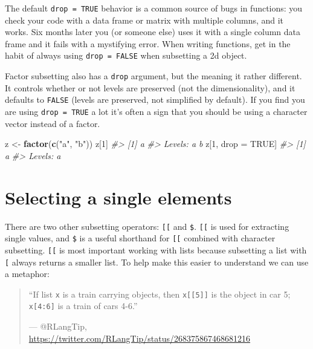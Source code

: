 \documentclass[]{book}
\newenvironment{Shaded}{\begin{snugshade}}{\end{snugshade}}
\newcommand{\KeywordTok}[1]{\textcolor[rgb]{0.13,0.29,0.53}{\textbf{#1}}}
\newcommand{\DecValTok}[1]{\textcolor[rgb]{0.00,0.00,0.81}{#1}}
\newcommand{\StringTok}[1]{\textcolor[rgb]{0.31,0.60,0.02}{#1}}
\newcommand{\CommentTok}[1]{\textcolor[rgb]{0.56,0.35,0.01}{\textit{#1}}}
\newcommand{\OtherTok}[1]{\textcolor[rgb]{0.56,0.35,0.01}{#1}}
\newcommand{\NormalTok}[1]{#1}
\theoremstyle{definition}
\theoremstyle{definition}
\theoremstyle{definition}
\theoremstyle{remark}
\begin{document}
The default \texttt{drop\ =\ TRUE} behavior is a common source of bugs
in functions: you check your code with a data frame or matrix with
multiple columns, and it works. Six months later you (or someone else)
uses it with a single column data frame and it fails with a mystifying
error. When writing functions, get in the habit of always using
\texttt{drop\ =\ FALSE} when subsetting a 2d object.

Factor subsetting also has a \texttt{drop} argument, but the meaning it
rather different. It controls whether or not levels are preserved (not
the dimensionality), and it defaults to \texttt{FALSE} (levels are
preserved, not simplified by default). If you find you are using
\texttt{drop\ =\ TRUE} a lot it's often a sign that you should be using
a character vector instead of a factor.

\begin{Shaded}
\begin{Highlighting}[]
\NormalTok{z <-}\StringTok{ }\KeywordTok{factor}\NormalTok{(}\KeywordTok{c}\NormalTok{(}\StringTok{"a"}\NormalTok{, }\StringTok{"b"}\NormalTok{))}
\NormalTok{z[}\DecValTok{1}\NormalTok{]}
\CommentTok{#> [1] a}
\CommentTok{#> Levels: a b}
\NormalTok{z[}\DecValTok{1}\NormalTok{, drop =}\StringTok{ }\OtherTok{TRUE}\NormalTok{]}
\CommentTok{#> [1] a}
\CommentTok{#> Levels: a}
\end{Highlighting}
\end{Shaded}

\section{Selecting a single elements}\label{selecting-a-single-elements}

There are two other subsetting operators: \texttt{{[}{[}} and
\texttt{\$}. \texttt{{[}{[}} is used for extracting single values, and
\texttt{\$} is a useful shorthand for \texttt{{[}{[}} combined with
character subsetting. \texttt{{[}{[}} is most important working with
lists because subsetting a list with \texttt{{[}} always returns a
smaller list. To help make this easier to understand we can use a
metaphor:

\begin{quote}
``If list \texttt{x} is a train carrying objects, then
\texttt{x{[}{[}5{]}{]}} is the object in car 5; \texttt{x{[}4:6{]}} is a
train of cars 4-6.''

--- @RLangTip,
\url{https://twitter.com/RLangTip/status/268375867468681216}
\end{quote}
\end{document}
